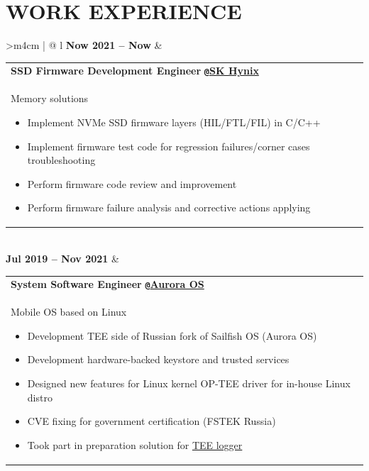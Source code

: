 \documentclass{anisyan-resume}
\begin{document}
	\section{\textbf{WORK EXPERIENCE}}
	\vspace{5pt}
	\renewcommand\arraystretch{0.5}
	\begin{tabularx}{\textwidth}{>{\quad}m{4cm} | @{\timelinebullet} l}
		\normalsize\textbf{Now 2021 -- Now}
		&
		\renewcommand\arraystretch{1}
		\begin{tabular}[t]{ p{15cm} }
		\large{\textbf{SSD Firmware Development Engineer}} \texttt{\textbf{@}}\href{https://skhms.by/en/sk-hynix-development-center-in-minsk/}{\textbf{SK Hynix}}\\
		\normalsize{Memory solutions}
		\renewcommand\labelitemi{{\boldmath$\cdot$}}
			\begin{itemize}[noitemsep, topsep=5pt, parsep=0pt, partopsep=0pt]
				\item {\small Implement NVMe SSD firmware layers (HIL/FTL/FIL) in C/C++}
				\item {\small Implement firmware test code for regression failures/corner cases troubleshooting}
				\item {\small Perform firmware code review and improvement}
				\item {\small Perform firmware failure analysis and corrective actions applying}
			\end{itemize}
		\end{tabular} \\

		\normalsize\textbf{Jul 2019 -- Nov 2021}
		&
		\renewcommand\arraystretch{1}
		\begin{tabular}[t]{ p{15cm} }
			\large{\textbf{System Software Engineer}} \texttt{\textbf{@}}\href{https://auroraos.ru/}{\textbf{Aurora OS}} \\
			\normalsize{Mobile OS based on Linux}
			\renewcommand\labelitemi{{\boldmath$\cdot$}}
			\begin{itemize}[noitemsep, topsep=5pt, parsep=0pt, partopsep=0pt]
				\item {\small Development TEE side of Russian fork of Sailfish OS (Aurora OS)}
				\item {\small Development hardware-backed keystore and trusted services}
				\item {\small Designed new features for Linux kernel OP-TEE driver for in-house Linux distro}
				\item {\small CVE fixing for government certification (FSTEK Russia)}
				\item {\small Took part in preparation solution for \href{https://github.com/OP-TEE/optee_os/issues/4230}{TEE logger}}
			\end{itemize}
		\end{tabular} \\


\end{tabularx}
\end{document}
